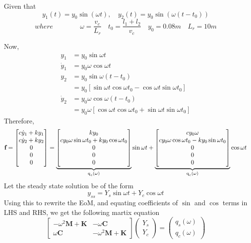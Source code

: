 \documentclass[11pt, oneside]{article}   	%
\begin{document}
Given that
$$ y_1(t) = y_0 \sin(\omega t), \quad y_2(t) = y_0 \sin(\omega (t-t_0))$$
$$where \quad \quad \quad \quad \omega=\frac{v_c}{L_r} \quad t_0=\frac{l_1+l_2}{v_c} \quad y_0 = 0.08m \quad L_r=10m$$

Now,
\begin{align}
 y_1 &= y_0 \sin{\omega t} \\
 \dot{y}_1 &= y_0 \omega \cos{\omega t} \\
 y_2 &= y_0 \sin{\omega(t-t_0)} \\
 &= y_0 [\sin{\omega t}\cos{\omega t_0} - \cos{\omega t} \sin{\omega t_0}] \\
 \dot{y}_2 &= y_0 \omega \cos{\omega(t-t_0)} \\
 &= y_0 \omega [\cos{\omega t}\cos{\omega t_0} + \sin{\omega t} \sin{\omega t_0}]
\end{align}
Therefore, \[\textbf{f} = \begin{bmatrix}
c \dot{y}_1 + k y_1 \\
c \dot{y}_2 + k y_2\\
0\\
0\\
0
\end{bmatrix} = \underbrace{\begin{bmatrix}
k y_0 \\
cy_0\omega\sin{\omega t_0} + k y_0\cos{\omega t_0}\\
0\\
0\\
0
\end{bmatrix}}_{\text q_s(\omega)} \sin{\omega t} + \underbrace{\begin{bmatrix}
c y_0 \omega \\
cy_0\omega\cos{\omega t_0} - k y_0\sin{\omega t_0}\\
0\\
0\\
0
\end{bmatrix}}_{\text q_c(\omega)} \cos{\omega t}
\]
Let the steady state solution be of the form
$$ y_{ss} = Y_s \sin{\omega t} + Y_c \cos{\omega t} $$
Using this to rewrite the EoM, and equating coefficients of $\sin$ and $\cos$ terms in LHS and RHS, we get the following martix equation
\[ \begin{bmatrix}
-\omega^2 \textbf{M} + \textbf{K} & -\omega \textbf{C}\\
\omega \textbf{C} & -\omega^2\textbf{M} + \textbf{K}
\end{bmatrix} \begin{pmatrix}
Y_s \\
Y_c
\end{pmatrix} = \begin{pmatrix}
q_s(\omega) \\
q_c(\omega)
\end{pmatrix}
\]
\end{document}
